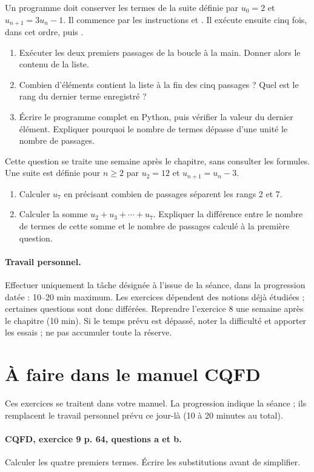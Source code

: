 Un programme doit conserver les termes de la suite définie par $u_0=2$ et $u_{n+1}=3u_n-1$. Il commence par les instructions  et . Il exécute ensuite cinq fois, dans cet ordre,  puis .
\begin{enumerate}[label=\arabic*.]
\item Exécuter les deux premiers passages de la boucle à la main. Donner alors le contenu de la liste.
\item Combien d’éléments contient la liste à la fin des cinq passages ? Quel est le rang du dernier terme enregistré ?
\item Écrire le programme complet en Python, puis vérifier la valeur du dernier élément. Expliquer pourquoi le nombre de termes dépasse d’une unité le nombre de passages.
\end{enumerate}
Cette question se traite une semaine après le chapitre, sans consulter les formules. Une suite est définie pour $n\geq2$ par $u_2=12$ et $u_{n+1}=u_n-3$.
\begin{enumerate}[label=\arabic*.]
\item Calculer $u_7$ en précisant combien de passages séparent les rangs 2 et 7.
\item Calculer la somme $u_2+u_3+\cdots+u_7$. Expliquer la différence entre le nombre de termes de cette somme et le nombre de passages calculé à la première question.
\end{enumerate}
\paragraph{Travail personnel.} Effectuer uniquement la tâche désignée à l’issue de la séance, dans la progression datée : 10–20 min maximum. Les exercices dépendent des notions déjà étudiées ; certaines questions sont donc différées. Reprendre l’exercice 8 une semaine après le chapitre (10 min). Si le temps prévu est dépassé, noter la difficulté et apporter les essais ; ne pas accumuler toute la réserve.
\endgroup
{}\section*{À faire dans le manuel CQFD}
Ces exercices se traitent dans votre manuel. La progression indique la séance ; ils remplacent le travail personnel prévu ce jour-là (10 à 20 minutes au total).
\paragraph{CQFD, exercice 9 p. 64, questions a et b.}\label{C01-M1} Calculer les quatre premiers termes. Écrire les substitutions avant de simplifier.
